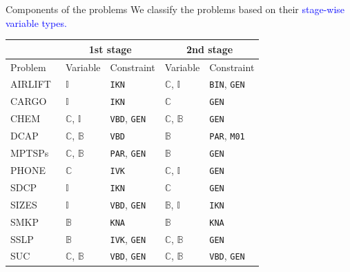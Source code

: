 \documentclass[usenames,dvipsnames]{beamer}
\def\seven{\fontsize{7pt}{7pt}\selectfont}
\newcommand{\airlift}{\textsf{AIRLIFT}}
\newcommand{\chem}{\textsf{CHEM}}
\newcommand{\dcap}{\textsf{DCAP}}
\newcommand{\sdcp}{\textsf{SDCP}}
\newcommand{\mptsps}{\textsf{MPTSPs}}
\newcommand{\sizes}{\textsf{SIZES}}
\newcommand{\smkp}{\textsf{SMKP}}
\newcommand{\sslp}{\textsf{SSLP}}
\newcommand{\suc}{\textsf{SUC}}
\newcommand{\cargo}{\textsf{CARGO}}
\newcommand{\phone}{\textsf{PHONE}}
\begin{document}
\begin{frame}{Components of the problems}
We classify the problems based on their \textcolor{blue}{stage-wise variable types.}		
\begin{table}[H]
\seven
\centering
\label{table:prob_class}
\begin{threeparttable}
\begin{tabular}{@{}lllll@{}}
\toprule
& \multicolumn{2}{c}{1st stage}                              				  	& \multicolumn{2}{c}{2nd stage}                             			        \\ \midrule
Problem 	     & Variable                    & Constraint                   	& Variable                    & Constraint                  				    \\ \midrule
\airlift\  & $\mathbb{I}$ & \texttt{IKN}& $\mathbb{C}$, $\mathbb{I}$ & \texttt{BIN}, \texttt{GEN}\\
\cargo\  & $\mathbb{I}$ & \texttt{IKN} & $\mathbb{C}$ & \texttt{GEN}\\		
\chem\  & $\mathbb{C}$, $\mathbb{I}$ & \texttt{VBD}, \texttt{GEN} & $\mathbb{C}$, $\mathbb{B}$ & \texttt{GEN}\\				
\dcap\     & $\mathbb{C}$, $\mathbb{B}$  & \texttt{VBD}                	& $\mathbb{B}$                & \texttt{PAR}, \texttt{M01} 			    		\\
\mptsps\   & $\mathbb{C}$, $\mathbb{B}$  & \texttt{PAR}, \texttt{GEN}		& $\mathbb{B}$                & \texttt{GEN}               						\\
\phone\  & $\mathbb{C}$ & \texttt{IVK} & $\mathbb{C}$, $\mathbb{I}$ & \texttt{GEN} \\			
\sdcp\ & $\mathbb{I}$ & \texttt{IKN}& $\mathbb{C}$ & \texttt{GEN}\\
\sizes\  & $\mathbb{I}$ 			   & \texttt{VBD}, \texttt{GEN} 	& $\mathbb{B}$, $\mathbb{I}$  & \texttt{IKN}             						\\
\smkp\   & $\mathbb{B}$                & \texttt{KNA}                	& $\mathbb{B}$                & \texttt{KNA}              						\\
\sslp\   & $\mathbb{B}$                & \texttt{IVK}, \texttt{GEN} 	& $\mathbb{C}$, $\mathbb{B}$  & \texttt{GEN}             						\\
\suc\   & $\mathbb{C}$, $\mathbb{B}$                 & \texttt{VBD}, \texttt{GEN}       	& $\mathbb{C}$, $\mathbb{B}$  &  \texttt{VBD}, \texttt{GEN}                                  					\\ \bottomrule

\end{tabular}
\end{threeparttable}
\end{table}
\end{frame}
\end{document}

